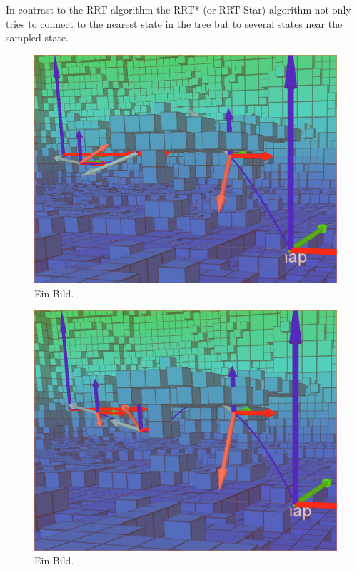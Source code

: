 In contrast to the RRT algorithm the RRT* (or RRT Star) algorithm not only tries to connect to the nearest state in the tree but to several states near the sampled state.



\begin{figure}[h]
   \centering
   \includegraphics[width=1\textwidth]{pics/initialSolution.png}
   \caption{Ein Bild.}
\end{figure}


\begin{figure}[h]
   \centering
   \includegraphics[width=1\textwidth]{pics/Vertex_in_middle_2.png}
   \caption{Ein Bild.}
\end{figure}

